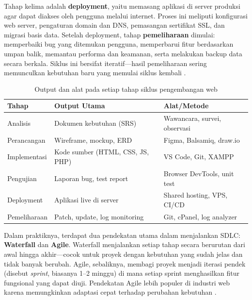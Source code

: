 Tahap kelima adalah \textbf{deployment}, yaitu memasang aplikasi di server produksi agar dapat diakses oleh pengguna melalui internet. Proses ini meliputi konfigurasi web server, pengaturan domain dan DNS, pemasangan sertifikat SSL, dan migrasi basis data. Setelah deployment, tahap \textbf{pemeliharaan} dimulai: memperbaiki bug yang ditemukan pengguna, memperbarui fitur berdasarkan umpan balik, memantau performa dan keamanan, serta melakukan backup data secara berkala. Siklus ini bersifat iteratif---hasil pemeliharaan sering memunculkan kebutuhan baru yang memulai siklus kembali \cite{mdnDeploy}.

\begin{table}[H]
\centering
\begin{tabular}{|P{2.5cm}|P{4cm}|P{5cm}|}
\hline
\textbf{Tahap} & \textbf{Output Utama} & \textbf{Alat/Metode} \\
\hline
Analisis & Dokumen kebutuhan (SRS) & Wawancara, survei, observasi \\
\hline
Perancangan & Wireframe, mockup, ERD & Figma, Balsamiq, draw.io \\
\hline
Implementasi & Kode sumber (HTML, CSS, JS, PHP) & VS Code, Git, XAMPP \\
\hline
Pengujian & Laporan bug, test report & Browser DevTools, unit test \\
\hline
Deployment & Aplikasi live di server & Shared hosting, VPS, CI/CD \\
\hline
Pemeliharaan & Patch, update, log monitoring & Git, cPanel, log analyzer \\
\hline
\end{tabular}
\caption{Output dan alat pada setiap tahap siklus pengembangan web}
\end{table}

Dalam praktiknya, terdapat dua pendekatan utama dalam menjalankan SDLC: \textbf{Waterfall} dan \textbf{Agile}. Waterfall menjalankan setiap tahap secara berurutan dari awal hingga akhir---cocok untuk proyek dengan kebutuhan yang sudah jelas dan tidak banyak berubah. Agile, sebaliknya, membagi proyek menjadi iterasi pendek (disebut \textit{sprint}, biasanya 1--2 minggu) di mana setiap sprint menghasilkan fitur fungsional yang dapat diuji. Pendekatan Agile lebih populer di industri web karena memungkinkan adaptasi cepat terhadap perubahan kebutuhan \cite{mdnLearn}.

